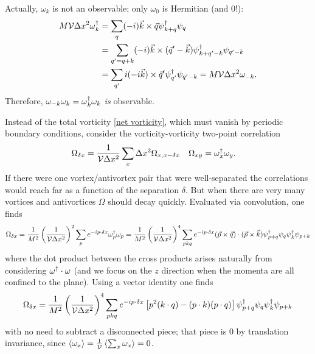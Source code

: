 Actually, $\omega_k$ is not an observable; only $\omega_0$ is Hermitian (and 0!):
\begin{align}
    M\mathcal{V} \Delta x^2 \omega{}^{\dagger}_k
    &= \sum_q (-i) \vec{k} \times \vec{q} \psi{}^{\dagger}_{k+q} \psi_{q}
    \nonumber\\
    &= \sum_{q' = q+k} (-i) \vec{k} \times (\vec{q}' - \vec{k}) \psi{}^{\dagger}_{k+q'-k} \psi_{q'-k}
    \nonumber\\
    &= \sum_{q'} i (-i\vec{k}) \times \vec{q}' \psi{}^{\dagger}_{q'} \psi_{q'-k} = M \mathcal{V} \Delta x^2 \omega_{-k}.
\end{align}
Therefore, $\omega_{-k} \omega_{k} = \omega{}^{\dagger}_k \omega_k$ \emph{is} observable.

Instead of the total vorticity \eqref{net vorticity}, which must vanish by periodic boundary conditions, consider the vorticity-vorticity two-point correlation
\begin{align}
	\Omega_{\delta x} &= \frac{1}{\mathcal{V} \Delta x^2} \sum_x \Delta x^2 \Omega_{x,x-\delta x}
&	\Omega_{xy} &= \omega{}^{\dagger}_x \omega_y.
\end{align}
If there were one vortex/antivortex pair that were well-separated the correlations would reach far as a function of the separation $\delta$.
But when there are very many vortices and antivortices $\Omega$ should decay quickly.
Evaluated via convolution, one finds
\begin{align}
	\Omega_{\delta x}
	= \frac{1}{M^2}\left(\frac{1}{\mathcal{V} \Delta x^2}\right)^2 \sum_p e^{-ip \cdot \delta x} \omega{}^{\dagger}_p \omega_p
	= \frac{1}{M^2}\left(\frac{1}{\mathcal{V} \Delta x^2}\right)^4 \sum_{pkq} e^{-ip \cdot \delta x} (\vec{p}\times\vec{q})\cdot(\vec{p}\times\vec{k}) \psi{}^{\dagger}_{p+q}\psi_q\psi{}^{\dagger}_k\psi_{p+k}
\end{align}
where the dot product between the cross products arises naturally from considering $\omega{}^{\dagger} \cdot \omega$ (and we focus on the $z$ direction when the momenta are all confined to the plane).
Using a vector identity one finds
\begin{align}
	\Omega_{\delta x}
	= \frac{1}{M^2}\left(\frac{1}{\mathcal{V} \Delta x^2}\right)^4 \sum_{pkq} e^{-ip \cdot \delta x} \left[p^2 (k\cdot q) - (p\cdot k)(p\cdot q)\right] \psi{}^{\dagger}_{p+q}\psi_q\psi{}^{\dagger}_k\psi_{p+k}
\end{align}
with no need to subtract a disconnected piece; that piece is 0 by translation invariance, since $\left\langle \omega_x \right\rangle = \frac{1}{\mathcal{V}} \left\langle \sum_x \omega_x \right\rangle = 0$.
